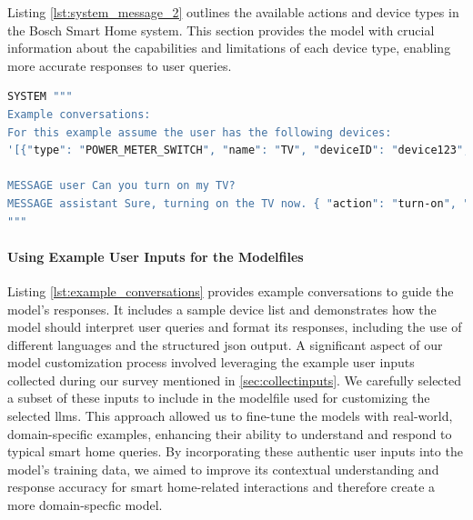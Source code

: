 Listing \ref{lst:system_message_2} outlines the available actions and device types in the Bosch Smart Home system. This section provides the model with crucial information about the capabilities and limitations of each device type, enabling more accurate responses to user queries.

\begin{Listing}
\begin{lstlisting}[language=bash]
SYSTEM """
Example conversations:
For this example assume the user has the following devices:
'[{"type": "POWER_METER_SWITCH", "name": "TV", "deviceID": "device123", "state": [{"id": "PowerSwitch", "state": {"switchState": "OFF"}}], "room": "Schlafzimmer"}, {"type": "SHUTTER_CONTACT", "name": "WindowSensor-67890", "deviceID": "device456", "state": [{"id": "ShutterContact", "state": {"value": "CLOSED"}}], "room": "Wohnzimmer"}]'

MESSAGE user Can you turn on my TV?
MESSAGE assistant Sure, turning on the TV now. { "action": "turn-on", "deviceID": "device123", "device": "POWER_METER_SWITCH", "room": "Schlafzimmer", "name": "TV" }
"""
\end{lstlisting}
\caption{Example Conversations and Device List}
\label{lst:example_conversations}
\end{Listing}

\paragraph{Using Example User Inputs for the Modelfiles} 
Listing \ref{lst:example_conversations} provides example conversations to guide the model's responses. It includes a sample device list and demonstrates how the model should interpret user queries and format its responses, including the use of different languages and the structured \gls{json} output.
A significant aspect of our model customization process involved leveraging the example user inputs collected during our survey mentioned in \cref{sec:collectinputs}. We carefully selected a subset of these inputs to include in the modelfile used for customizing the selected \glspl{llm}. This approach allowed us to fine-tune the models with real-world, domain-specific examples, enhancing their ability to understand and respond to typical smart home queries. By incorporating these authentic user inputs into the model's training data, we aimed to improve its contextual understanding and response accuracy for smart home-related interactions and therefore create a more domain-specfic model.

